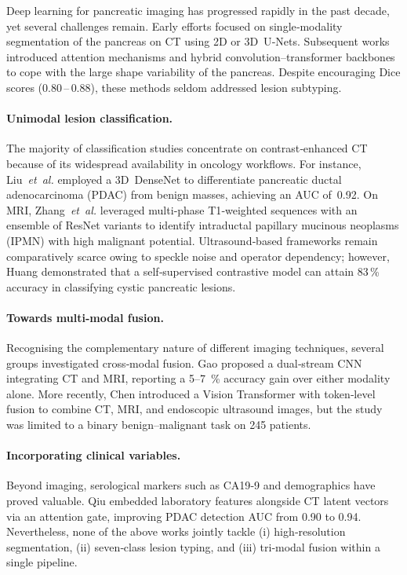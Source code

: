 \documentclass[a4paper, fleqn]{cas-dc}
\begin{document}
    Deep learning for pancreatic imaging has progressed rapidly in the past decade,
    yet several challenges remain. Early efforts focused on single‐modality segmentation
    of the pancreas on CT using 2D or 3D~U‑Nets\citep{Roth2015}. Subsequent
    works introduced attention mechanisms\citep{Zhou2020} and hybrid
    convolution–transformer backbones\citep{Ma2022} to cope with the large shape
    variability of the pancreas. Despite encouraging Dice scores ($0.80\,–\,0.88$),
    these methods seldom addressed lesion subtyping.

    \paragraph{Unimodal lesion classification.}
    The majority of classification studies concentrate on contrast‐enhanced CT because
    of its widespread availability in oncology workflows. For instance, Liu~\textit{et~al.}\citep{Liu2020}
    employed a 3D~DenseNet to differentiate pancreatic ductal adenocarcinoma (PDAC)
    from benign masses, achieving an AUC of~0.92. On MRI, Zhang~\textit{et~al.}\citep{Zhang2021}
    leveraged multi‑phase T1‐weighted sequences with an ensemble of ResNet
    variants to identify intraductal papillary mucinous neoplasms (IPMN) with
    high malignant potential. Ultrasound‐based frameworks remain comparatively scarce
    owing to speckle noise and operator dependency; however, Huang\citep{Huang2022}
    demonstrated that a self‑supervised contrastive model can attain 83\,\% accuracy
    in classifying cystic pancreatic lesions.

    \paragraph{Towards multi‐modal fusion.}
    Recognising the complementary nature of different imaging techniques, several
    groups investigated cross‐modal fusion. Gao\citep{Gao2022} proposed a
    dual‐stream CNN integrating CT and MRI, reporting a 5–7~\% accuracy gain over
    either modality alone. More recently, Chen\citep{Chen2023} introduced a Vision
    Transformer with token‐level fusion to combine CT, MRI, and endoscopic ultrasound
    images, but the study was limited to a binary benign–malignant task on 245
    patients.

    \paragraph{Incorporating clinical variables.}
    Beyond imaging, serological markers such as CA19‑9 and demographics have
    proved valuable. Qiu\citep{Qiu2023} embedded laboratory features alongside CT
    latent vectors via an attention gate, improving PDAC detection AUC from 0.90
    to 0.94. Nevertheless, none of the above works jointly tackle (i)
    high‐resolution segmentation, (ii) seven‐class lesion typing, and (iii)
    tri‑modal fusion within a single pipeline.
\end{document}

